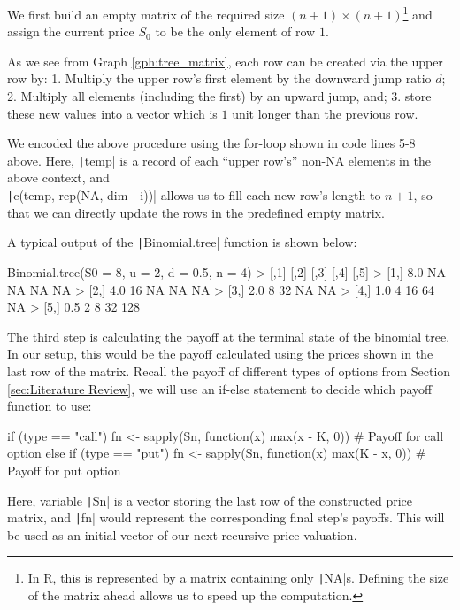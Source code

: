 We first build an empty matrix of the required size $(n+1)\times(n+1)$\footnote{In R, this is represented by a matrix containing only \texttt|NA|s. Defining the size of the matrix ahead allows us to speed up the computation.} and assign the current price $S_0$ to be the only element of row $1$.

As we see from Graph \ref{gph:tree_matrix}, each row can be created via the upper row by: 1. Multiply the upper row's first element by the downward jump ratio $d$; 2. Multiply all elements (including the first) by an upward jump, and; 3. store these new values into a vector which is $1$ unit longer than the previous row.

We encoded the above procedure using the for-loop shown in code lines 5-8 above. Here, \texttt|temp| is a record of each ``upper row's'' non-NA elements in the above context, and \\ \texttt|c(temp, rep(NA, dim - i))| allows us to fill each new row's length to $n+1$, so that we can directly update the rows in the predefined empty matrix.

A typical output of the \texttt|Binomial.tree| function is shown below:

\begin{Rminted}
Binomial.tree(S0 = 8, u = 2, d = 0.5, n = 4)
>      [,1] [,2] [,3] [,4] [,5]
> [1,]  8.0   NA   NA   NA   NA
> [2,]  4.0   16   NA   NA   NA
> [3,]  2.0    8   32   NA   NA
> [4,]  1.0    4   16   64   NA
> [5,]  0.5    2    8   32  128
\end{Rminted}

The third step is calculating the payoff at the terminal state of the binomial tree. In our setup, this would be the payoff calculated using the prices shown in the last row of the matrix. Recall the payoff of different types of options from Section \ref{sec:Literature Review}, we will use an if-else statement to decide which payoff function to use:

\begin{Rminted}
if (type == "call") {
    fn <- sapply(Sn, function(x) {max(x - K, 0)}) # Payoff for call option
} else if (type == "put") {
    fn <- sapply(Sn, function(x) {max(K - x, 0)}) # Payoff for put option
}
\end{Rminted}

Here, variable \texttt|Sn| is a vector storing the last row of the constructed price matrix, and \texttt|fn| would represent the corresponding final step's payoffs. This will be used as an initial vector of our next recursive price valuation.

